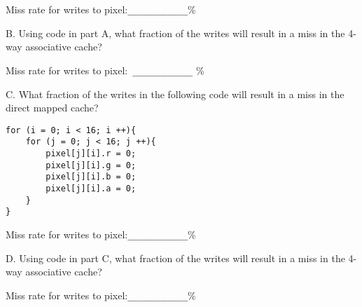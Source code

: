 Miss rate for writes to pixel:\verb|____________|\%

\vspace{0.25in}

B. Using code in part A, what fraction of the writes will result in a miss in the 4-way associative cache?

Miss rate for writes to pixel:\verb| ____________| \%

\vspace{0.25in}

C. What fraction of the writes in the following code will result in a miss in the direct mapped cache?

\begin{verbatim}
for (i = 0; i < 16; i ++){
    for (j = 0; j < 16; j ++){
        pixel[j][i].r = 0;
        pixel[j][i].g = 0;
        pixel[j][i].b = 0;
        pixel[j][i].a = 0;
    }
}
\end{verbatim}

Miss rate for writes to pixel:\verb|____________|\%

\vspace{0.25in}

D. Using code in part C, what fraction of the writes will result in a miss in the 4-way associative cache?

Miss rate for writes to pixel:\verb|____________|\%

